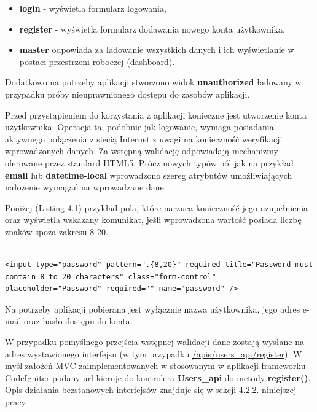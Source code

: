\begin{itemize}
\item \textbf{login} - wyświetla formularz logowania,
\item \textbf{register} - wyświetla formularz dodawania nowego konta użytkownika,
\item \textbf{master} odpowiada za ładowanie wszystkich danych i ich wyświetlanie w postaci przestrzeni roboczej (dashboard).
\end{itemize}

Dodatkowo na potrzeby aplikacji stworzono widok \textbf{unauthorized} ładowany w przypadku próby nieuprawnionego dostępu do zasobów aplikacji.

Przed przystąpieniem do korzystania z aplikacji konieczne jest utworzenie konta użytkownika. Operacja ta, podobnie jak logowanie, wymaga posiadania aktywnego połączenia z siecią Internet z uwagi na konieczność weryfikacji wprowadzonych danych. Za wstępną walidację odpowiadają mechanizmy oferowane przez standard HTML5\cite{html5Valid}. Prócz nowych typów pól jak na przykład \textbf{email} lub \textbf{datetime-local} wprowadzono szereg atrybutów umożliwiających nałożenie wymagań na wprowadzane dane.

Poniżej (Listing 4.1) przykład pola, które narzuca konieczność jego uzupełnienia oraz wyświetla wskazany komunikat, jeśli wprowadzona wartość posiada liczbę znaków spoza zakresu 8-20.

\begin{lstlisting}[caption=Przykład pola "hasło" w widoku rejestracji., label=amb, captionpos=b]

<input type="password" pattern=".{8,20}" required title="Password must contain 8 to 20 characters" class="form-control" placeholder="Password" required="" name="password" />

\end{lstlisting}

Na potrzeby aplikacji pobierana jest wyłącznie nazwa użytkownika, jego adres e-mail oraz hasło dostępu do konta.

W przypadku pomyślnego przejścia wstępnej walidacji dane zostają wysłane na adres wystawionego interfejsu (w tym przypadku \url{/apis/users_api/register}). W myśl założeń MVC zaimplementowanych w stosowanym w aplikacji frameworku CodeIgniter\cite{codeigniterUserGuide} podany url kieruje do kontrolera \textbf{Users\_api} do metody \textbf{register()}. Opis działania bezstanowych interfejsów znajduje się w sekcji 4.2.2. niniejszej pracy.

